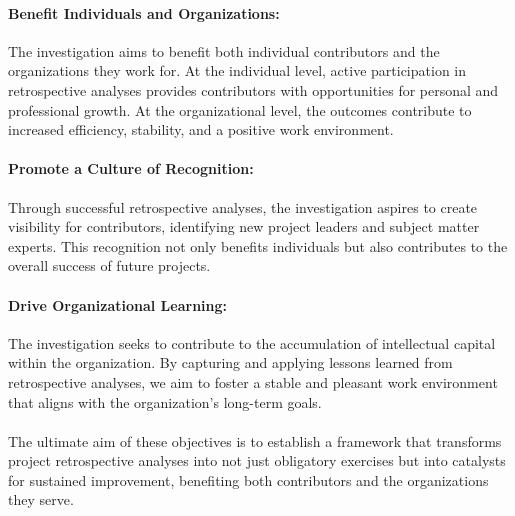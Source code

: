 \documentclass{article}
\begin{document}
\paragraph*{Benefit Individuals and Organizations:} The investigation aims to benefit both individual contributors and the organizations they work for. At the individual level, active participation in retrospective analyses provides contributors with opportunities for personal and professional growth. At the organizational level, the outcomes contribute to increased efficiency, stability, and a positive work environment.

\paragraph*{Promote a Culture of Recognition:} Through successful retrospective analyses, the investigation aspires to create visibility for contributors, identifying new project leaders and subject matter experts. This recognition not only benefits individuals but also contributes to the overall success of future projects.

\paragraph*{Drive Organizational Learning:} The investigation seeks to contribute to the accumulation of intellectual capital within the organization. By capturing and applying lessons learned from retrospective analyses, we aim to foster a stable and pleasant work environment that aligns with the organization's long-term goals.
\\
\\The ultimate aim of these objectives is to establish a framework that transforms project retrospective analyses into not just obligatory exercises but into catalysts for sustained improvement, benefiting both contributors and the organizations they serve.
\end{document}

